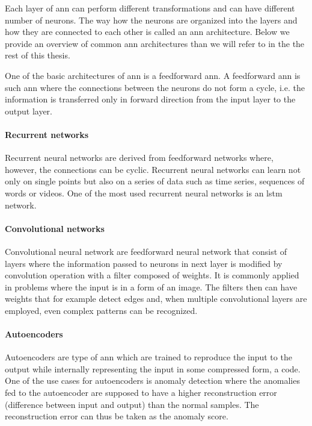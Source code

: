 Each layer of \acrshort{ann} can perform different transformations and can have different number of neurons.
The way how the neurons are organized into the layers and how they are connected to each other is called an \acrshort{ann} architecture.
Below we provide an overview of common \acrshort{ann} architectures than we will refer to in the the rest of this thesis.

One of the basic architectures of \acrshort{ann} is a feedforward \acrshort{ann}.
A feedforward \acrshort{ann} is such \acrshort{ann} where the connections between the neurons do not form a cycle, i.e. the information is transferred only in forward direction from the input layer to the output layer.

\paragraph{Recurrent networks}
Recurrent neural networks are derived from feedforward networks where, however, the connections can be cyclic.
Recurrent neural networks can learn not only on single points but also on a series of data such as time series, sequences of words or videos.
One of the most used recurrent neural networks is an \acrfull{lstm} network.

\paragraph{Convolutional networks}
Convolutional neural network are feedforward neural network that consist of layers where the information passed to neurons in next layer is modified by convolution operation with a filter composed of weights.
It is commonly applied in problems where the input is in a form of an image.
The filters then can have weights that for example detect edges and, when multiple convolutional layers are employed, even complex patterns can be recognized.

\paragraph{Autoencoders}
Autoencoders are type of \acrshort{ann} which are trained to reproduce the input to the output while internally representing the input in some compressed form, a code.
One of the use cases for autoencoders is anomaly detection where the anomalies fed to the autoencoder are supposed to have a higher reconstruction error (difference between input and output) than the normal samples.
The reconstruction error can thus be taken as the anomaly score.

